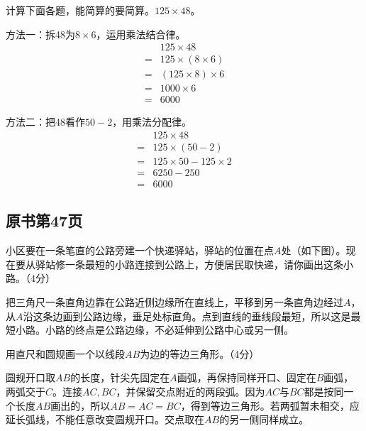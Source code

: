 计算下面各题，能简算的要简算。\(125\times48\)。\par
\begin{BookAnswer}
方法一：拆48为\(8\times6\)，运用乘法结合律。\[\begin{aligned}&125\times48\\={}&125\times(8\times6)\\={}&(125\times8)\times6\\={}&1000\times6\\={}&6000\end{aligned}\]\par 方法二：把48看作\(50-2\)，用乘法分配律。\[\begin{aligned}&125\times48\\={}&125\times(50-2)\\={}&125\times50-125\times2\\={}&6250-250\\={}&6000\end{aligned}\]
\end{BookAnswer}



\subsection*{原书第47页}

小区要在一条笔直的公路旁建一个快递驿站，驿站的位置在点\(A\)处（如下图）。现在要从驿站修一条最短的小路连接到公路上，方便居民取快递，请你画出这条小路。（4分）\par
{}
\begin{BookAnswer}
把三角尺一条直角边靠在公路近侧边缘所在直线上，平移到另一条直角边经过\(A\)，从\(A\)沿这条边画到公路边缘，垂足处标直角。点到直线的垂线段最短，所以这是最短小路。小路的终点是公路边缘，不必延伸到公路中心或另一侧。
\end{BookAnswer}

用直尺和圆规画一个以线段\(AB\)为边的等边三角形。（4分）\par
{}
\begin{BookAnswer}
圆规开口取\(AB\)的长度，针尖先固定在\(A\)画弧，再保持同样开口、固定在\(B\)画弧，两弧交于\(C\)。连接\(AC,BC\)，并保留交点附近的两段弧。因为\(AC\)与\(BC\)都是按同一个长度\(AB\)画出的，所以\(AB=AC=BC\)，得到等边三角形。若两弧暂未相交，应延长弧线，不能任意改变圆规开口。交点取在\(AB\)的另一侧同样成立。
\end{BookAnswer}

